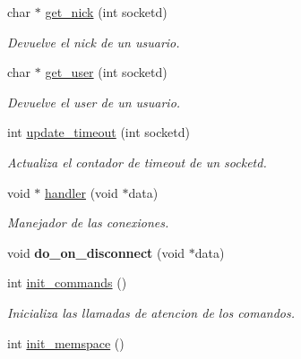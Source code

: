\begin{DoxyCompactItemize}
char $\ast$ \hyperlink{G-2301-01-P1-irc__server_8c_aa3349e4f305bf79f00ca290220f8eba6}{get\+\_\+nick} (int socketd)
\begin{DoxyCompactList}\small\item\em Devuelve el nick de un usuario. \end{DoxyCompactList}\item 
char $\ast$ \hyperlink{G-2301-01-P1-irc__server_8c_ac4440aef92f908bd8efb73a1b2e0198e}{get\+\_\+user} (int socketd)
\begin{DoxyCompactList}\small\item\em Devuelve el user de un usuario. \end{DoxyCompactList}\item 
int \hyperlink{G-2301-01-P1-irc__server_8c_a30562243bab7c3ba21af7a673c085748}{update\+\_\+timeout} (int socketd)
\begin{DoxyCompactList}\small\item\em Actualiza el contador de timeout de un socketd. \end{DoxyCompactList}\item 
void $\ast$ \hyperlink{G-2301-01-P1-irc__server_8c_a65c3f29a112085899806687533f22b3e}{handler} (void $\ast$data)
\begin{DoxyCompactList}\small\item\em Manejador de las conexiones. \end{DoxyCompactList}\item 
\hypertarget{G-2301-01-P1-irc__server_8c_a7a48a7d5c815970d546cb8d11f0f4f28}{}void {\bfseries do\+\_\+on\+\_\+disconnect} (void $\ast$data)\label{G-2301-01-P1-irc__server_8c_a7a48a7d5c815970d546cb8d11f0f4f28}

\item 
\hypertarget{G-2301-01-P1-irc__server_8c_a3ba8a297e9ee4dae232c9328cabac358}{}int \hyperlink{G-2301-01-P1-irc__server_8c_a3ba8a297e9ee4dae232c9328cabac358}{init\+\_\+commands} ()\label{G-2301-01-P1-irc__server_8c_a3ba8a297e9ee4dae232c9328cabac358}

\begin{DoxyCompactList}\small\item\em Inicializa las llamadas de atencion de los comandos. \end{DoxyCompactList}\item 
\hypertarget{G-2301-01-P1-irc__server_8c_a9de005a0e561ec6a8db39e95a0866ee9}{}int \hyperlink{G-2301-01-P1-irc__server_8c_a9de005a0e561ec6a8db39e95a0866ee9}{init\+\_\+memspace} ()\label{G-2301-01-P1-irc__server_8c_a9de005a0e561ec6a8db39e95a0866ee9}


\end{DoxyCompactItemize}
